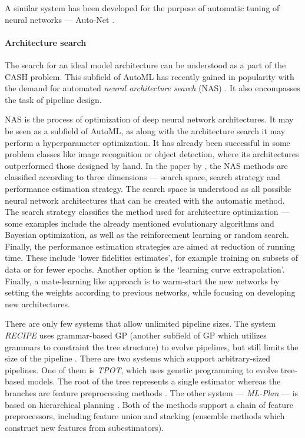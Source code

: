 A similar system has been developed for the purpose of automatic tuning of neural
networks --- Auto-Net \citep{pmlr-v64-mendoza_towards_2016}.

\paragraph{Architecture search}
The search for an ideal model architecture can be understood as a part of the
CASH problem. This subfield of AutoML has recently gained in popularity with the
demand for automated \emph{neural architecture search} (NAS)
\citep{2018arXiv180805377E}. It also encompasses the task of pipeline design.

NAS is the process of optimization of deep neural network architectures. It may be
seen as a subfield of AutoML, as along with the architecture search it may perform
a hyperparameter optimization. It has already been
successful in some problem classes like image recognition or object detection, where
its architectures outperformed those designed by hand. In the paper by \label{NAS:perf}
\cite{2018arXiv180805377E}, the NAS methods are classified according to three
dimensions --- search space, search strategy and performance estimation strategy.
The search space is understood as all possible neural network architectures that
can be created with the automatic method. The search strategy classifies the method
used for architecture optimization --- some examples include the already mentioned
evolutionary algorithms and Bayesian optimization, as well as the reinforcement
learning or random search. Finally, the performance estimation strategies are aimed
at reduction of running time. These include `lower fidelities estimates', for example
training on subsets of data or for fewer epochs. Another option is the `learning
curve extrapolation'. Finally, a mate-learning like approach is to warm-start the
new networks by setting the weights according to previous networks, while focusing
on developing new architectures.

There are only few systems that allow unlimited pipeline sizes. The system
\emph{RECIPE} uses grammar-based GP (another subfield of GP which utilizes grammars
to constraint the tree structure) to evolve pipelines, but still limits the
size of the pipeline \citep{10.1007/978-3-319-55696-3_16}.
There are two systems which support arbitrary-sized pipelines. One of them is
\emph{TPOT}, which uses genetic programming to evolve tree-based models. The
root of the tree represents a single estimator whereas the branches are feature
preprocessing methods \citep{Olson2016EvoBio}.
The other system --- \emph{ML-Plan} --- is based on hierarchical planning
\citep{Mohr2018}. Both of the methods support a chain of feature preprocessors,
including feature union and stacking (ensemble methods which construct new
features from subestimators).

